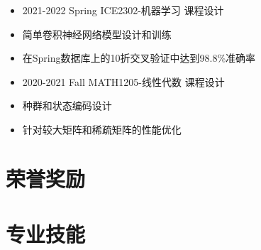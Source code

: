 \documentclass{resume}
\begin{document}
\begin{itemize}[parsep=0.5ex]
  \item 2021-2022 Spring ICE2302-机器学习 课程设计
  \item 简单卷积神经网络模型设计和训练
  \item 在Spring数据库上的10折交叉验证中达到98.8\%准确率
\end{itemize}

\begin{itemize}[parsep=0.5ex]
  \item 2020-2021 Fall MATH1205-线性代数 课程设计
  \item 种群和状态编码设计
  \item 针对较大矩阵和稀疏矩阵的性能优化
\end{itemize}


\section{荣誉奖励}


\section{专业技能}
\end{document}
